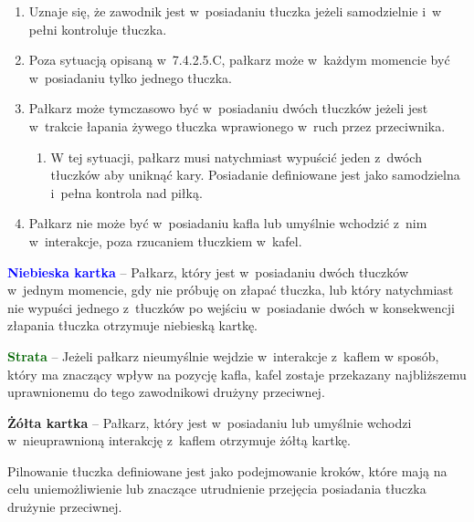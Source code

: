 \documentclass[12pt,a4paper]{article}
\renewcommand{\paragraph}[1]{
  \oldparagraph{#1}%
  \leftskip2.8cm
}
\newcommand\yellowcard[1]{\bgroup\textcolor{darkyellow}{\textbf{#1}}}
\newcommand\bluecard[1]{\bgroup\textcolor{blue}{\textbf{#1}}}
\newcommand\other[1]{\bgroup\textcolor{darkgreen}{\textbf{#1}}}
\begin{document}
\begin{enumerate}
	\item
	      Uznaje się, że zawodnik jest w~posiadaniu tłuczka jeżeli samodzielnie
	      i~w pełni kontroluje tłuczka.
	\item
	      Poza sytuacją opisaną w~7.4.2.5.C, pałkarz może w~każdym momencie być
	      w~posiadaniu tylko jednego tłuczka.
	\item
	      Pałkarz może tymczasowo być w~posiadaniu dwóch tłuczków jeżeli jest w~trakcie łapania żywego tłuczka wprawionego w~ruch przez przeciwnika.

	      \begin{enumerate}
		      \item
		            W tej sytuacji, pałkarz musi natychmiast wypuścić jeden z~dwóch
		            tłuczków aby uniknąć kary. Posiadanie definiowane jest jako
		            samodzielna i~pełna kontrola nad piłką.
	      \end{enumerate}
	\item
	      Pałkarz nie może być w~posiadaniu kafla lub umyślnie wchodzić z~nim w~interakcje, poza rzucaniem tłuczkiem w~kafel.
\end{enumerate}

\bluecard{Niebieska kartka} -- Pałkarz, który jest w~posiadaniu dwóch
tłuczków w~jednym momencie, gdy nie próbuję on złapać tłuczka, lub który
natychmiast nie wypuści jednego z~tłuczków po wejściu w~posiadanie dwóch
w konsekwencji złapania tłuczka otrzymuje niebieską kartkę.

\other{Strata} -- Jeżeli pałkarz nieumyślnie wejdzie w~interakcje z~kaflem
w sposób, który ma znaczący wpływ na pozycję kafla, kafel zostaje
przekazany najbliższemu uprawnionemu do tego zawodnikowi drużyny
przeciwnej.

\yellowcard{Żółta kartka} -- Pałkarz, który jest w~posiadaniu lub umyślnie
wchodzi w~nieuprawnioną interakcję z~kaflem otrzymuje żółtą kartkę.

\paragraph{Pilnowanie tłuczków}
Pilnowanie tłuczka definiowane
jest jako podejmowanie kroków, które mają na celu uniemożliwienie lub
znaczące utrudnienie przejęcia posiadania tłuczka drużynie przeciwnej.
\end{document}
